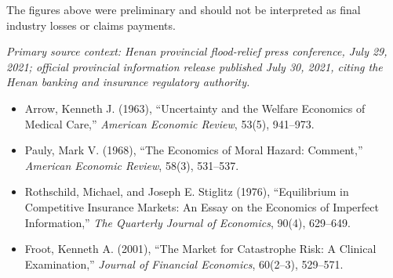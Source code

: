 The figures above were preliminary and should not be interpreted as final industry losses or claims payments.

\emph{Primary source context: Henan provincial flood-relief press conference, July 29, 2021; official provincial information release published July 30, 2021, citing the Henan banking and insurance regulatory authority.}




\begin{itemize}

\item Arrow, Kenneth J. (1963),
``Uncertainty and the Welfare Economics of Medical Care,''
\emph{American Economic Review}, 53(5), 941--973.

\item Pauly, Mark V. (1968),
``The Economics of Moral Hazard: Comment,''
\emph{American Economic Review}, 58(3), 531--537.

\item Rothschild, Michael, and Joseph E. Stiglitz (1976),
``Equilibrium in Competitive Insurance Markets: An Essay on the Economics of Imperfect Information,''
\emph{The Quarterly Journal of Economics}, 90(4), 629--649.

\item Froot, Kenneth A. (2001),
``The Market for Catastrophe Risk: A Clinical Examination,''
\emph{Journal of Financial Economics}, 60(2--3), 529--571.

\end{itemize}


